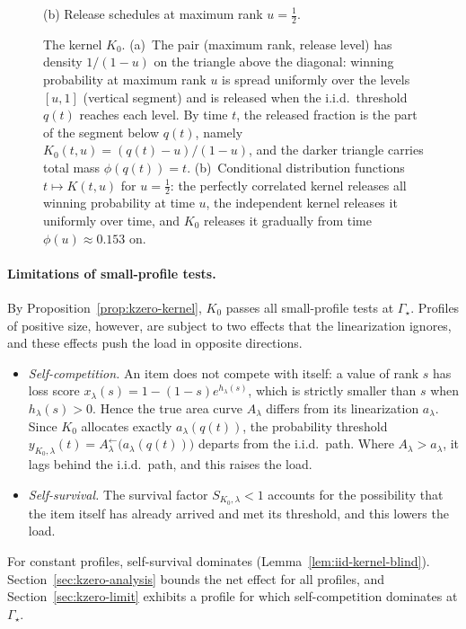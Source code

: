 \documentclass[11pt]{article}
\theoremstyle{definition}
\theoremstyle{remark}
\begin{document}
\begin{figure}[t]
\begin{minipage}[b]{0.49\linewidth}
\small (b) Release schedules at maximum rank $u=\frac12$.
\end{minipage}
\caption{The kernel $K_0$.
(a)~The pair (maximum rank, release level) has density $1/(1-u)$ on the triangle above the
diagonal: winning probability at maximum rank $u$ is spread uniformly over the levels $[u,1]$
(vertical segment) and is released when the i.i.d.\ threshold $q(t)$ reaches each level. By
time $t$, the released fraction is the part of the segment below $q(t)$, namely
$K_0(t,u)=(q(t)-u)/(1-u)$, and the darker triangle carries total mass $\phi(q(t))=t$.
(b)~Conditional distribution functions $t\mapsto K(t,u)$ for $u=\frac12$: the perfectly
correlated kernel releases all winning probability at time $u$, the independent kernel
releases it uniformly over time, and $K_0$ releases it gradually from time
$\phi(u)\approx0.153$ on.}
\label{fig:kzero}
\end{figure}

\paragraph{Limitations of small-profile tests.}
By Proposition~\ref{prop:kzero-kernel}, $K_0$ passes all small-profile tests at $\Gamma_\star$.
Profiles of positive size, however, are subject to two effects that the linearization ignores, and these effects push the load in opposite directions.
\begin{itemize}
\item \emph{Self-competition.}
An item does not compete with itself: a value of rank $s$ has loss score $x_\lambda(s)=1-(1-s)e^{h_\lambda(s)}$, which is strictly smaller than $s$ when $h_\lambda(s)>0$.
Hence the true area curve $A_\lambda$ differs from its linearization $a_\lambda$.
Since $K_0$ allocates exactly $a_\lambda(q(t))$, the probability threshold $y_{K_0,\lambda}(t)=A_\lambda^\leftarrow\bigl(a_\lambda(q(t))\bigr)$ departs from the i.i.d.\ path.
Where $A_\lambda>a_\lambda$, it lags behind the i.i.d.\ path, and this raises the load.
\item \emph{Self-survival.}
The survival factor $S_{K_0,\lambda}<1$ accounts for the possibility that the item itself has already arrived and met its threshold, and this lowers the load.
\end{itemize}
For constant profiles, self-survival dominates (Lemma~\ref{lem:iid-kernel-blind}).
Section~\ref{sec:kzero-analysis} bounds the net effect for all profiles, and Section~\ref{sec:kzero-limit} exhibits a profile for which self-competition dominates at $\Gamma_\star$.
\end{document}
